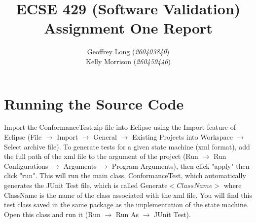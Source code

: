 \documentclass[11pt, a4paper]{article}
\title{ECSE 429 (Software Validation) \\ Assignment One Report}
\author{Geoffrey Long (\textit{260403840}) \\ Kelly Morrison (\textit{260459446})}
\begin{document}
\maketitle





\newpage
\section{Running the Source Code}
Import the ConformanceTest.zip file into Eclipse using the Import feature of Eclipse (File $\rightarrow$ Import $\rightarrow$ General $\rightarrow$ Existing Projects into Workspace $\rightarrow$ Select archive file). To generate tests for a given state machine (xml format), add the full path of the xml file to the argument of the project (Run $\rightarrow$ Run Configurations $\rightarrow$ Arguments $\rightarrow$ Program Arguments), then click "apply" then click "run". This will run the main class, ConformanceTest, which automatically generates the JUnit Test file, which is called Generate$<ClassName>$ where ClassName is the name of the class associated with the xml file. You will find this test class saved in the same package as the implementation of the state machine. Open this class and run it (Run $\rightarrow$ Run As $\rightarrow$ JUnit Test). 

\end{document}
